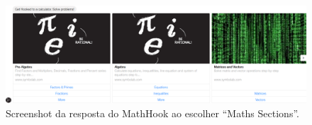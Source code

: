 \begin{figure}[h!tbp]
    \centering
    \includegraphics[width=0.65\linewidth]{img/bot1_2.png}
    \caption{Screenshot da resposta do MathHook ao escolher ``Maths Sections''.}
    \label{fig:bot1_2}
\end{figure}
